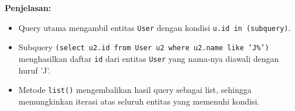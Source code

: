 \textbf{Penjelasan:}
\begin{itemize}
	\item Query utama mengambil entitas \texttt{User} dengan kondisi \texttt{u.id in (subquery)}.
	\item Subquery \texttt{(select u2.id from User u2 where u2.name like 'J\%')} menghasilkan daftar \texttt{id} dari entitas \texttt{User} yang nama-nya diawali dengan huruf 'J'.
	\item Metode \texttt{list()} mengembalikan hasil query sebagai list, sehingga memungkinkan iterasi atas seluruh entitas yang memenuhi kondisi.
\end{itemize}

